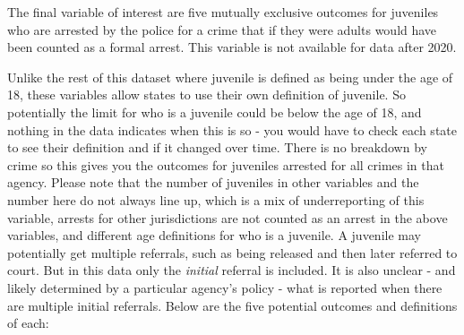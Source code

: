 \documentclass[
]{krantz}
\begin{document}
The final variable of interest are five mutually exclusive
outcomes for juveniles who are arrested by the police for a
crime that if they were adults would have been counted as a
formal arrest. This variable is not available for data after
2020.

Unlike the rest of this dataset where juvenile is defined as
being under the age of 18, these variables allow states to
use their own definition of juvenile. So potentially the
limit for who is a juvenile could be below the age of 18,
and nothing in the data indicates when this is so - you
would have to check each state to see their definition and
if it changed over time. There is no breakdown by crime so
this gives you the outcomes for juveniles arrested for all
crimes in that agency. Please note that the number of
juveniles in other variables and the number here do not
always line up, which is a mix of underreporting of this
variable, arrests for other jurisdictions are not counted as
an arrest in the above variables, and different age
definitions for who is a juvenile. A juvenile may
potentially get multiple referrals, such as being released
and then later referred to court. But in this data only the
\emph{initial} referral is included. It is also unclear -
and likely determined by a particular agency's policy - what
is reported when there are multiple initial referrals. Below
are the five potential outcomes and definitions of each:
\end{document}
